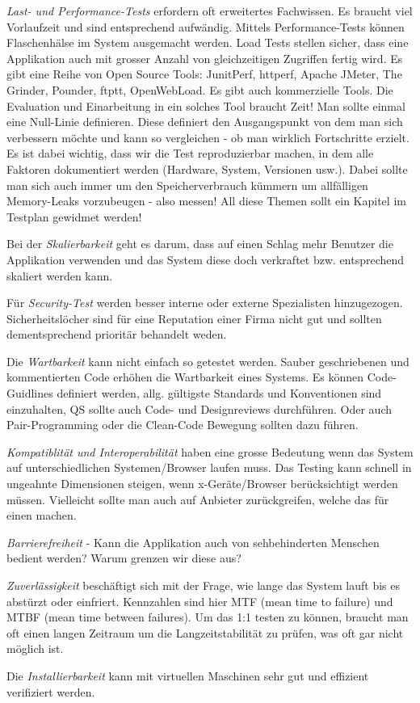\begin{description}
	\emph{Last- und Performance-Tests} erfordern oft erweitertes Fachwissen. Es braucht viel Vorlaufzeit und sind entsprechend aufwändig. Mittels Performance-Tests können Flaschenhälse im System ausgemacht werden. Load Tests stellen sicher, dass eine Applikation auch mit grosser Anzahl von gleichzeitigen Zugriffen fertig wird. Es gibt eine Reihe von Open Source Tools: JunitPerf, httperf, Apache JMeter, The Grinder, Pounder, ftptt, OpenWebLoad. Es gibt auch kommerzielle Tools. Die Evaluation und Einarbeitung in ein solches Tool braucht Zeit! Man sollte einmal eine Null-Linie definieren. Diese definiert den Ausgangspunkt von dem man sich verbessern möchte und kann so vergleichen - ob man wirklich Fortschritte erzielt. Es ist dabei wichtig, dass wir die Test reproduzierbar machen, in dem alle Faktoren dokumentiert werden (Hardware, System, Versionen usw.). Dabei sollte man sich auch immer um den Speicherverbrauch kümmern um allfälligen Memory-Leaks vorzubeugen - also messen! All diese Themen sollt ein Kapitel im Testplan gewidmet werden!
	
	Bei der \emph{Skalierbarkeit} geht es darum, dass auf einen Schlag mehr Benutzer die Applikation verwenden und das System diese doch verkraftet bzw. entsprechend skaliert werden kann.
	
	Für \emph{Security-Test} werden besser interne oder externe Spezialisten hinzugezogen. Sicherheitslöcher sind für eine Reputation einer Firma nicht gut und sollten dementsprechend prioritär behandelt weden.
	
	Die \emph{Wartbarkeit} kann nicht einfach so getestet werden. Sauber geschriebenen und kommentierten Code erhöhen die Wartbarkeit eines Systems. Es können Code-Guidlines definiert werden, allg. gültigste Standards und Konventionen sind einzuhalten, QS sollte auch Code- und Designreviews durchführen. Oder auch Pair-Programming oder die Clean-Code Bewegung sollten dazu führen.
	
	\emph{Kompatiblität und Interoperabilität} haben eine grosse Bedeutung wenn das System auf unterschiedlichen Systemen/Browser laufen muss. Das Testing kann schnell in ungeahnte Dimensionen steigen, wenn x-Geräte/Browser berücksichtigt werden müssen. Vielleicht sollte man auch auf Anbieter zurückgreifen, welche das für einen machen.
	
	\emph{Barrierefreiheit} - Kann die Applikation auch von sehbehinderten Menschen bedient werden? Warum grenzen wir diese aus?
	
	\emph{Zuverlässigkeit} beschäftigt sich mit der Frage, wie lange das System lauft bis es abstürzt oder einfriert. Kennzahlen sind hier MTF (mean time to failure) und MTBF (mean time between failures). Um das 1:1 testen zu können, braucht man oft einen langen Zeitraum um die Langzeitstabilität zu prüfen, was oft gar nicht möglich ist.
	
	Die \emph{Installierbarkeit} kann mit virtuellen Maschinen sehr gut und effizient verifiziert werden.
	 
\end{description}